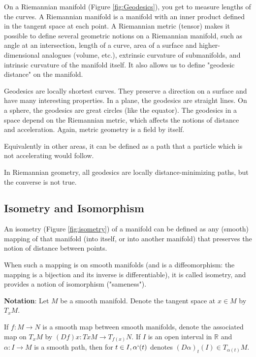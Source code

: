 \documentclass[a4paper,10pt]{article}
\begin{document}
On a Riemannian manifold (Figure \ref{fig:Geodesics}), you get to measure lengths of the curves. A Riemannian manifold is a manifold with an inner product defined in the tangent space at each point. A Riemannian metric (tensor) makes it possible to define several geometric notions on a Riemannian manifold, such as angle at an intersection, length of a curve, area of a surface and higher-dimensional analogues (volume, etc.), extrinsic curvature of submanifolds, and intrinsic curvature of the manifold itself. It also allows us to define "geodesic distance" on the manifold.

Geodesics are locally shortest curves. They preserve a direction on a surface and have many interesting properties. In a plane, the geodesics are straight lines. On a sphere, the geodesics are great circles (like the equator). The geodesics in a space depend on the Riemannian metric, which affects the notions of distance and acceleration. Again, metric geometry is a field by itself.

Equivalently in other areas, it can be defined as a path that a particle which is not accelerating would follow.

In Riemannian geometry, all geodesics are locally distance-minimizing paths, but the converse is not true.

\subsection{Isometry and Isomorphism}


An isometry (Figure \ref{fig:isometry}) of a manifold can be defined as any (smooth) mapping of that manifold (into itself, or into another manifold) that preserves the notion of distance between points.

When such a mapping is on smooth manifolds (and is a diffeomorphism: the mapping is a bijection and its inverse is differentiable), it is called isometry, and provides a notion of isomorphism ("sameness").


\textbf{Notation}: Let $ M $ be a smooth manifold. Denote the tangent space at $ x \in M $ by $ T_{x}M $.

If $ f:M \xrightarrow{} N $ is a smooth map between smooth manifolds, denote the associated map on $ T_{x}M $ by $ (Df){x}:T{x}M \xrightarrow{} T_{f(x)}N $. If $ I $ is an open interval in $ \mathbb{R} $ and $ \alpha : I \xrightarrow{} M $ is a smooth path, then for $ t \in I, \alpha` (t) $ denotes $ (D \alpha)_{t}(I) \in T_{\alpha(t)}M $.
\end{document}

